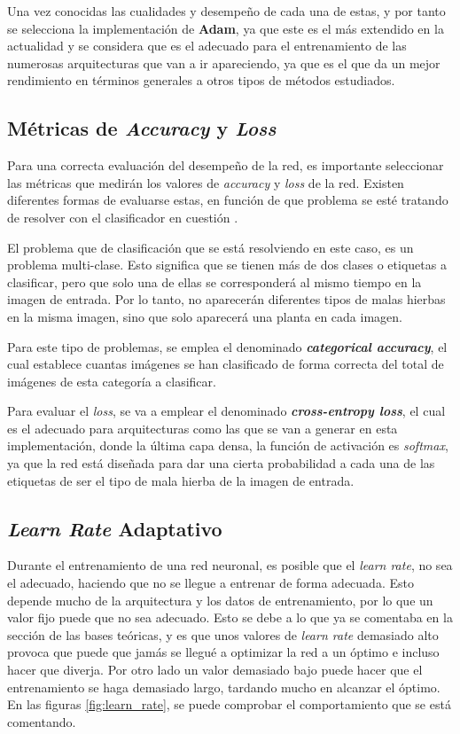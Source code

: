 Una vez conocidas las cualidades \cite{DBLP:journals/corr/Ruder16} y desempeño \cite{jiang_visual_2020} de cada una de estas, y por tanto se selecciona la implementación de \textbf{Adam}, ya que este es el más extendido en la actualidad y se considera que es el adecuado para el entrenamiento de las numerosas arquitecturas que van a ir apareciendo, ya que es el que da un mejor rendimiento en términos generales a otros tipos de métodos estudiados.

\subsection{Métricas de \textit{Accuracy} y \textit{Loss}}

Para una correcta evaluación del desempeño de la red, es importante seleccionar las métricas que medirán los valores de \textit{accuracy} y \textit{loss} de la red. Existen diferentes formas de evaluarse estas, en función de que problema se esté tratando de resolver con el clasificador en cuestión \cite{dommaraju_keras_2020}.

El problema que de clasificación que se está resolviendo en este caso, es un problema multi-clase. Esto significa que se tienen más de dos clases o etiquetas a clasificar, pero que solo una de ellas se corresponderá al mismo tiempo en la imagen de entrada. Por lo tanto, no aparecerán diferentes tipos de malas hierbas en la misma imagen, sino que solo aparecerá una planta en cada imagen.

Para este tipo de problemas, se emplea el denominado \textbf{\textit{categorical accuracy}}, el cual establece cuantas imágenes se han clasificado de forma correcta del total de imágenes de esta categoría a clasificar.

Para evaluar el \textit{loss}, se va a emplear el denominado \textbf{\textit{cross-entropy loss}}, el cual es el adecuado para arquitecturas como las que se van a generar en esta implementación, donde la última capa densa, la función de activación es \textit{softmax}, ya que la red está diseñada para dar una cierta probabilidad a cada una de las etiquetas de ser el tipo de mala hierba de la imagen de entrada.

\subsection{\textit{Learn Rate} Adaptativo}

Durante el entrenamiento de una red neuronal, es posible que el \textit{learn rate}, no sea el adecuado, haciendo que no se llegue a entrenar de forma adecuada. Esto depende mucho de la arquitectura y los datos de entrenamiento, por lo que un valor fijo puede que no sea adecuado. Esto se debe a lo que ya se comentaba en la sección de las bases teóricas, y es que unos valores de \textit{learn rate} demasiado alto provoca que puede que jamás se llegué a optimizar la red a un óptimo e incluso hacer que diverja. Por otro lado un valor demasiado bajo puede hacer que el entrenamiento se haga demasiado largo, tardando mucho en alcanzar el óptimo. En las figuras \ref{fig:learn_rate}, se puede comprobar el comportamiento que se está comentando.

